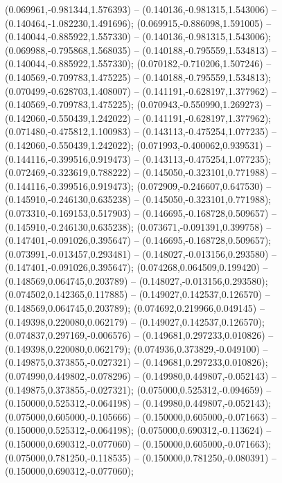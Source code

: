  (0.069961,-0.981344,1.576393) -- (0.140136,-0.981315,1.543006) -- (0.140464,-1.082230,1.491696);
 (0.069915,-0.886098,1.591005) -- (0.140044,-0.885922,1.557330) -- (0.140136,-0.981315,1.543006);
 (0.069988,-0.795868,1.568035) -- (0.140188,-0.795559,1.534813) -- (0.140044,-0.885922,1.557330);
 (0.070182,-0.710206,1.507246) -- (0.140569,-0.709783,1.475225) -- (0.140188,-0.795559,1.534813);
 (0.070499,-0.628703,1.408007) -- (0.141191,-0.628197,1.377962) -- (0.140569,-0.709783,1.475225);
 (0.070943,-0.550990,1.269273) -- (0.142060,-0.550439,1.242022) -- (0.141191,-0.628197,1.377962);
 (0.071480,-0.475812,1.100983) -- (0.143113,-0.475254,1.077235) -- (0.142060,-0.550439,1.242022);
 (0.071993,-0.400062,0.939531) -- (0.144116,-0.399516,0.919473) -- (0.143113,-0.475254,1.077235);
 (0.072469,-0.323619,0.788222) -- (0.145050,-0.323101,0.771988) -- (0.144116,-0.399516,0.919473);
 (0.072909,-0.246607,0.647530) -- (0.145910,-0.246130,0.635238) -- (0.145050,-0.323101,0.771988);
 (0.073310,-0.169153,0.517903) -- (0.146695,-0.168728,0.509657) -- (0.145910,-0.246130,0.635238);
 (0.073671,-0.091391,0.399758) -- (0.147401,-0.091026,0.395647) -- (0.146695,-0.168728,0.509657);
 (0.073991,-0.013457,0.293481) -- (0.148027,-0.013156,0.293580) -- (0.147401,-0.091026,0.395647);
 (0.074268,0.064509,0.199420) -- (0.148569,0.064745,0.203789) -- (0.148027,-0.013156,0.293580);
 (0.074502,0.142365,0.117885) -- (0.149027,0.142537,0.126570) -- (0.148569,0.064745,0.203789);
 (0.074692,0.219966,0.049145) -- (0.149398,0.220080,0.062179) -- (0.149027,0.142537,0.126570);
 (0.074837,0.297169,-0.006576) -- (0.149681,0.297233,0.010826) -- (0.149398,0.220080,0.062179);
 (0.074936,0.373829,-0.049100) -- (0.149875,0.373855,-0.027321) -- (0.149681,0.297233,0.010826);
 (0.074990,0.449802,-0.078296) -- (0.149980,0.449807,-0.052143) -- (0.149875,0.373855,-0.027321);
 (0.075000,0.525312,-0.094659) -- (0.150000,0.525312,-0.064198) -- (0.149980,0.449807,-0.052143);
 (0.075000,0.605000,-0.105666) -- (0.150000,0.605000,-0.071663) -- (0.150000,0.525312,-0.064198);
 (0.075000,0.690312,-0.113624) -- (0.150000,0.690312,-0.077060) -- (0.150000,0.605000,-0.071663);
 (0.075000,0.781250,-0.118535) -- (0.150000,0.781250,-0.080391) -- (0.150000,0.690312,-0.077060);
